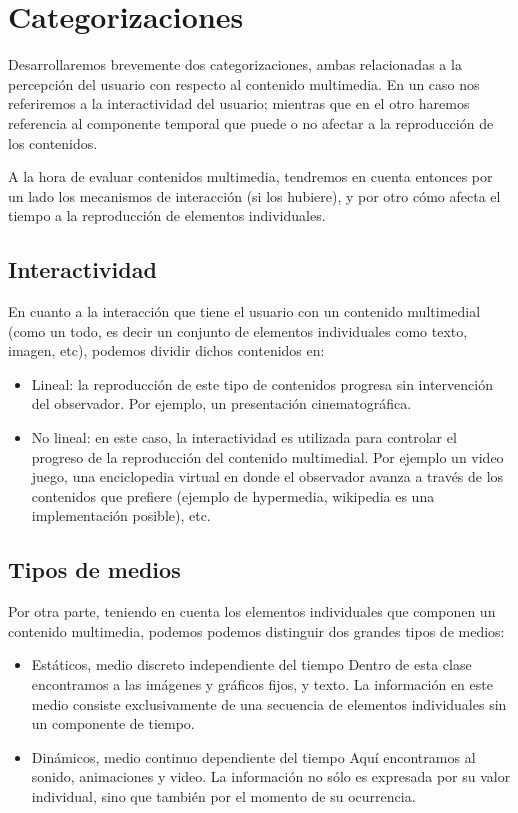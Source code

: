 \documentclass[12pt]{article}
\begin{document}
\section*{Categorizaciones}

Desarrollaremos brevemente dos categorizaciones, ambas relacionadas a la 
percepción del usuario con respecto al contenido multimedia. En un caso 
nos referiremos a la interactividad del usuario; mientras que en el otro 
haremos referencia al componente temporal que puede o no afectar a la
reproducción de los contenidos. 

A la hora de evaluar contenidos multimedia, tendremos en cuenta entonces
por un lado los mecanismos de interacción (si los hubiere), y por otro 
cómo afecta el tiempo a la reproducción de elementos individuales. 

\subsection*{Interactividad}
En cuanto a la interacción que tiene el usuario con un contenido 
multimedial (como un todo, es decir un conjunto de elementos individuales
como texto, imagen, etc), podemos dividir dichos contenidos en: 
\begin{itemize}
\item Lineal: la reproducción de este tipo de contenidos progresa 
sin intervención del observador. Por ejemplo, un presentación cinematográfica.  
\item No lineal: en este caso, la interactividad es utilizada para 
controlar el progreso de la reproducción del contenido multimedial. Por 
ejemplo un video juego, una enciclopedia virtual en donde el observador
avanza a través de los contenidos que prefiere (ejemplo de hypermedia, 
wikipedia es una implementación posible), etc. 
\end{itemize}

\subsection*{Tipos de medios}
Por otra parte, teniendo en cuenta los elementos individuales que componen un 
contenido multimedia, podemos podemos distinguir dos grandes tipos de medios: 

\begin{itemize}
\item{Estáticos, medio discreto independiente del tiempo}
Dentro de esta clase encontramos a las imágenes y gráficos fijos, y texto. La información 
en este medio consiste exclusivamente de una secuencia de elementos individuales 
sin un componente de tiempo.
\item{Dinámicos, medio continuo dependiente del tiempo}
Aquí encontramos al sonido, animaciones y video. La información no sólo es 
expresada por su valor individual, sino que también por el momento 
de su ocurrencia.
\end{itemize}
\end{document}
